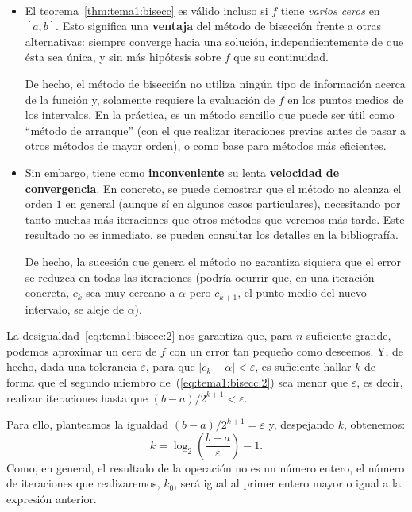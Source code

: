 \begin{remark}
  \label{rk:tema1:unicidad-bisecc}
  ~
  \begin{itemize}
  \item El teorema~\ref{thm:tema1:bisecc} es válido incluso si $f$
    tiene \emph{varios ceros} en $[a,b]$. Esto significa una
    \textbf{ventaja} del método de bisección frente a otras
    alternativas: siempre converge hacia una solución,
    independientemente de que ésta sea única, y sin más hipótesis
    sobre $f$ que su continuidad.

    De hecho, el método de bisección no utiliza ningún tipo de
    información acerca de la función y, solamente requiere la
    evaluación de $f$ en los puntos medios de los intervalos. En la
    práctica, es un método sencillo que puede ser útil como ``método
    de arranque'' (con el que realizar iteraciones previas antes de
    pasar a otros métodos de mayor orden), o como base para métodos
    más eficientes.

  \item Sin embargo, tiene como \textbf{inconveniente} su lenta
    \textbf{velocidad de convergencia}. En concreto, se puede
    demostrar que el método no alcanza el orden $1$ en general
    (aunque sí en algunos casos particulares), necesitando por tanto
    muchas más iteraciones que otros métodos que veremos más tarde.
    Este resultado no es inmediato, se pueden consultar los detalles
    en la bibliografía.

    De hecho, la sucesión que genera el método no garantiza siquiera
    que el error se reduzca en todas las iteraciones (podría ocurrir
    que, en una iteración concreta, $c_k$ sea muy cercano a $\alpha$
    pero $c_{k+1}$, el punto medio del nuevo intervalo, se aleje de
    $\alpha$).


  \end{itemize}
\end{remark}

\begin{remark}
  \label{rk:tema1:bisecc:iteraciones}
  La desigualdad~\eqref{eq:tema1:bisecc:2} nos garantiza que, para $n$
  suficiente grande, podemos aproximar un cero de $f$ con un error tan
  pequeño como deseemos. Y, de hecho, dada una tolerancia
  $\varepsilon$, para que $|c_k-\alpha|<\varepsilon$, es suficiente
  hallar $k$ de forma que el segundo miembro
  de~(\ref{eq:tema1:bisecc:2}) sea menor que $\varepsilon$, es decir,
  realizar iteraciones hasta que $(b-a)/2^{k+1} < \varepsilon$.

  Para ello, planteamos la igualdad $(b-a)/2^{k+1} = \varepsilon$ y, despejando $k$, obtenemos:
  \begin{equation*}
    k=\log_2\left(\frac{b-a}{\varepsilon}\right)-1.
  \end{equation*}
  Como, en general, el resultado de la operación no es un número
  entero, el número de iteraciones que realizaremos, $k_0$, será igual
  al primer entero mayor o igual a la expresión anterior.
\end{remark}

